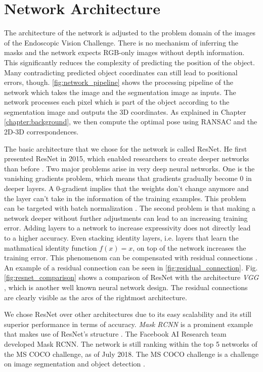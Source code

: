 \section{Network Architecture}

The architecture of the network is adjusted to the problem domain of the images of the Endoscopic Vision Challenge. There is no mechanism of inferring the masks and the network expects RGB-only images without depth information. This significantly reduces the complexity of predicting the position of the object. Many contradicting predicted object coordinates can still lead to positional errors, though. \fig \ref{fig:network_pipeline} shows the processing pipeline of the network which takes the image and the segmentation image as inputs. The network processes each pixel which is part of the object according to the segmentation image and outputs the 3D coordinates. As explained in Chapter \ref{chapter:background}, we then compute the optimal pose using RANSAC and the 2D-3D correspondences.

The basic architecture that we chose for the network is called ResNet. He \etal first presented ResNet in 2015, which enabled researchers to create deeper networks than before \cite{resnet}. Two major problems arise in very deep neural networks. One is the vanishing gradients problem, which means that gradients gradually become 0 in deeper layers. A 0-gradient implies that the weights don't change anymore and the layer can't take in the information of the training examples. This problem can be targeted with batch normalization \cite{resnet}. The second problem is that making a network deeper without further adjustments can lead to an increasing training error. Adding layers to a network to increase expressivity does not directly lead to a higher accuracy. Even stacking identity layers, i.e. layers that learn the mathmatical identity function $f(x) = x$, on top of the network increases the training error. This phenomenom can be compensated with residual connections \cite{resnet}. An example of a residual connection can be seen in \fig \ref{fig:residual_connection}. Fig. \ref{fig:resnet_comparison} shows a comparison of ResNet with the architecture \textit{VGG} \cite{vgg}, which is another well known neural network design. The residual connections are clearly visible as the arcs of the rightmost architecture.

We chose ResNet over other architectures due to its easy scalability and its still superior performance in terms of accuracy. \textit{Mask RCNN} is a prominent example that makes use of ResNet's structure \cite{mask_rcnn}. The Facebook AI Research team developed Mask RCNN. The network is still ranking within the top 5 networks of the MS COCO challenge, as of July 2018. The MS COCO challenge is a challenge on image segmentation and object detection \cite{mscoco}.


